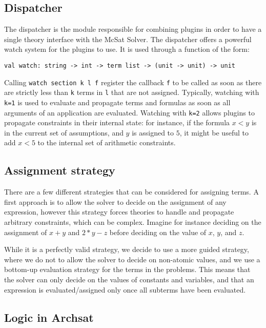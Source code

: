 \subsection{Dispatcher}

The dispatcher is the module responsible for combining plugins in order
to have a single theory interface with the McSat Solver. The dispatcher
offers a powerful watch system for the plugins to use. It is used through
a function of the form:
\begin{lstlisting}
val watch: string -> int -> term list -> (unit -> unit) -> unit
\end{lstlisting}

Calling \lstinline{watch section k l f} register the callback \lstinline{f} to be called
as soon as there are strictly less than \lstinline{k} terms in \lstinline{l} that
are not assigned. Typically, watching with \lstinline{k=1} is used to evaluate and
propagate terms and formulas as soon as all arguments of an application are evaluated.
Watching with \lstinline{k=2} allows plugins to propagate constraints in their internal
state: for instance, if the formula $x < y$ is in the current set of assumptions,
and $y$ is assigned to $5$, it might be useful to add $x < 5$ to the internal set of
arithmetic constraints.

\subsection{Assignment strategy}

There are a few different strategies that can be considered for assigning terms.
A first approach is to allow the solver to decide on the assignment of any expression,
however this strategy forces theories to handle and propagate arbitrary constraints,
which can be complex. Imagine for instance deciding on the assignment of
$x + y$ and $2 * y - z$ before deciding on the value of $x$, $y$, and $z$.

While it is a perfectly valid strategy, we decide to use a more guided strategy,
where we do not to allow the solver to decide
on non-atomic values, and we use a bottom-up evaluation strategy for the terms
in the problems. This means that the solver can only decide on the values of constants
and variables, and that an expression is evaluated/assigned only once all subterms have
been evaluated.

\subsection{Logic in Archsat}

